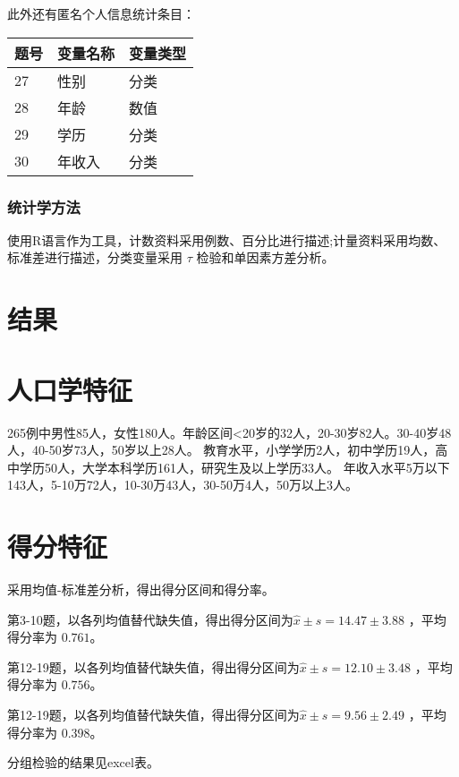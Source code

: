 \documentclass{article}
\begin{document}
此外还有匿名个人信息统计条目：

\begin{longtable}[]{@{}lll@{}}

题号 & 变量名称 & 变量类型\tabularnewline
\hline
\endhead
27 & 性别 & 分类\tabularnewline
28 & 年龄 & 数值\tabularnewline
29 & 学历 & 分类\tabularnewline
30 & 年收入 & 分类\tabularnewline
\hline
\end{longtable}


\subsubsection{统计学方法}
使用R语言作为工具，计数资料采用例数、百分比进行描述;计量资料采用均数、标准差进行描述，分类变量采用 $\tau$ 检验和单因素方差分析。

\section{结果}

\section{人口学特征}
265例中男性85人，女性180人。年龄区间<20岁的32人，20-30岁82人。30-40岁48人，40-50岁73人，50岁以上28人。
教育水平，小学学历2人，初中学历19人，高中学历50人，大学本科学历161人，研究生及以上学历33人。
年收入水平5万以下143人，5-10万72人，10-30万43人，30-50万4人，50万以上3人。

\section{得分特征}
采用均值-标准差分析，得出得分区间和得分率。

第3-10题，以各列均值替代缺失值，得出得分区间为$\hat{x}\pm s = 14.47 \pm 3.88$ ，平均得分率为 $0.761$。

第12-19题，以各列均值替代缺失值，得出得分区间为$\hat{x}\pm s = 12.10 \pm 3.48$ ，平均得分率为 $0.756$。

第12-19题，以各列均值替代缺失值，得出得分区间为$\hat{x}\pm s = 9.56 \pm 2.49$ ，平均得分率为 $0.398$。

分组检验的结果见excel表。
\end{document}
